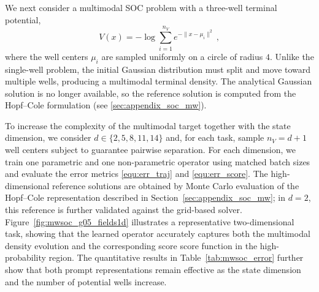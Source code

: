 \documentclass[preprint]{elsarticle}
\newcommand{\m}{\mu}
\begin{document}
We next consider a multimodal SOC problem with a three-well terminal potential, 
\[
    V(x)=-\log\sum_{i=1}^{n_V}e^{-\|x-\m_i\|^2}
    \ ,
\]
where the well centers $\m_i$ are sampled uniformly on a circle of radius $4$. Unlike the single-well problem, the initial Gaussian distribution must split and move toward multiple wells, producing a multimodal terminal density. The analytical Gaussian solution is no longer available, so the reference solution is computed from the Hopf--Cole formulation (see \ref{sec:appendix_soc_mw}). 

To increase the complexity of the multimodal target together with the state dimension, we consider $d\in\{2,5,8,11,14\}$ and, for each task, sample $n_V=d+1$ well centers subject to guarantee pairwise separation. For each dimension, we train one parametric and one non-parametric operator using matched batch sizes and evaluate the error metrics \eqref{equ:err_traj} and \eqref{equ:err_score}. The high-dimensional reference solutions are obtained by Monte Carlo evaluation of the Hopf--Cole representation described in Section~\ref{sec:appendix_soc_mw}; in $d=2$, this reference is further validated against the grid-based solver. Figure~\ref{fig:mwsoc_g05_fields1d} illustrates a representative two-dimensional task, showing that the learned operator accurately captures both the multimodal density evolution and the corresponding score score function in the high-probability region. The quantitative results in Table~\ref{tab:mwsoc_error} further show that both prompt representations remain effective as the state dimension and the number of potential wells increase.
\end{document}
